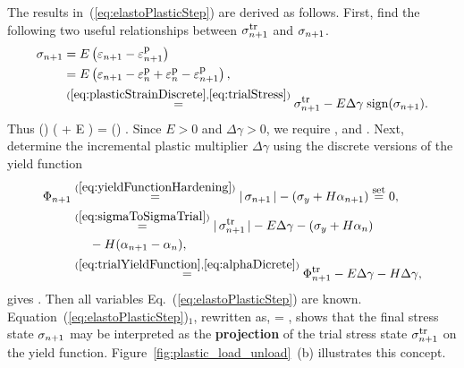 The results in~(\ref{eq:elastoPlasticStep}) are derived as follows.  First, 
find the following two useful relationships between $\sigma^{\mbox{\footnotesize tr}}_{n+1}$ and $\sigma_{n+1}$.
\begin{align}
 \sigma_{n+1} & = E \left(\varepsilon_{n+1} - \varepsilon^{\mbox{\footnotesize p}}_{n+1} \right) \\
 & = E \left(\varepsilon_{n+1} - \varepsilon^{\mbox{\footnotesize p}}_{n} + \varepsilon^{\mbox{\footnotesize p}}_{n} - \varepsilon^{\mbox{\footnotesize p}}_{n+1} \right), \\
 & \overset{(\ref{eq:plasticStrainDiscrete}, \ref{eq:trialStress})}{=} 
 \sigma^{\mbox{\footnotesize tr}}_{n+1} - E \Delta \gamma \; \mbox{sign}(\sigma_{n+1}).
\end{align}
Thus 
\be 
\sign(\sigmanp) \left( \abs{\sigmanp} + E \Delta \gamma \right)  =  
\sign(\sigmatrnp) \abs{\sigmatrnp}.
\ee
Since $E > 0$ and $\Delta \gamma > 0$, we require
\be
\boxed{\sign(\sigmanp) = \sign(\sigmatrnp)},
\ee
and
\be
{}.
\label{eq:sigmaToSigmaTrial}
\ee
Next, determine the
incremental plastic multiplier $\Delta \gamma$ using the 
discrete versions of the yield function
\begin{align}
 \Phi_{n+1} 
 & \overset{(\ref{eq:yieldFunctionHardening})}{=} | \, \sigma_{n+1} \, | - \left( 
 \sigma_y + H \alpha_{n+1} \right) \overset{\mbox{\footnotesize set}}{=} 0, \\
 & \overset{(\ref{eq:sigmaToSigmaTrial})}{=} | \, \sigma^{\mbox{\footnotesize tr}}_{n+1} \, | - 
 E \Delta \gamma - \left(\sigma_y + H \alpha_n \right) \nonumber \\
 & \hspace{0.5cm} - H (\alpha_{n+1} - \alpha_n), \\
 & \overset{(\ref{eq:trialYieldFunction}, \ref{eq:alphaDicrete})}{=} 
 \Phi^{\mbox{\footnotesize tr}}_{n+1} - E \Delta \gamma - H \Delta \gamma,  
\end{align}
gives
\be
 .
\ee
Then all variables Eq.~(\ref{eq:elastoPlasticStep}) are known.  
Equation~(\ref{eq:elastoPlasticStep})$_1$, rewritten as,
\be
 \sigmanp 
 =  \sigmatrnp,
\ee
shows that the final stress 
state $\sigma_{n+1}$ may be interpreted as the {\bf projection} of the trial stress
state $\sigma^{\mbox{\footnotesize tr}}_{n+1}$ on the yield function.  
Figure~\ref{fig:plastic_load_unload}~(b) illustrates this concept.


